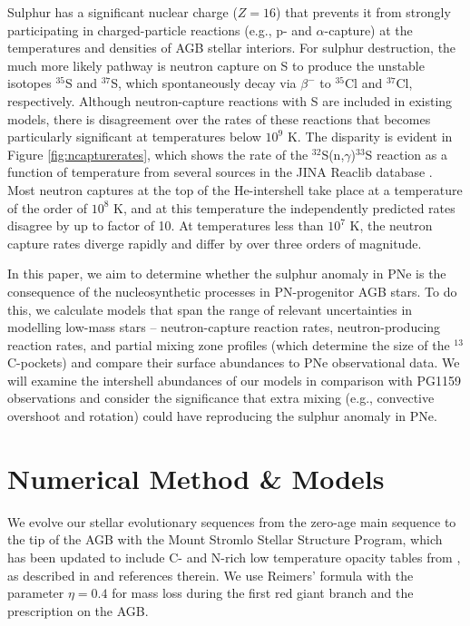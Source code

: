 Sulphur has a significant nuclear charge ($Z=16$) that prevents it from strongly participating in charged-particle reactions (e.g., p- and $\alpha$-capture) at the temperatures and densities of AGB stellar interiors. For sulphur destruction, the much more likely pathway is neutron capture on S to produce the unstable isotopes $^{35}$S and $^{37}$S, which spontaneously decay via $\beta^-$ to $^{35}$Cl and $^{37}$Cl, respectively.  Although neutron-capture reactions with S are included in existing models, there is disagreement over the rates of these reactions that becomes particularly significant at temperatures below $10^9$ K. The disparity is evident in Figure \ref{fig:ncapturerates}, which shows the rate of the $^{32}$S(n,$\gamma$)$^{33}$S reaction as a function of temperature from several sources in the JINA Reaclib database \citep{Cyburt:2010ey}. Most neutron captures at the top of the He-intershell take place at a temperature of the order of $10^8$ K, and at this temperature the independently predicted rates disagree by up to factor of 10. At temperatures less than $10^7$ K, the neutron capture rates diverge rapidly and differ by over three orders of magnitude.

In this paper, we aim to determine whether the sulphur anomaly in PNe is the consequence of the nucleosynthetic processes in PN-progenitor AGB stars. To do this, we calculate models that span the range of relevant uncertainties in modelling low-mass stars -- neutron-capture reaction rates, neutron-producing reaction rates, and partial mixing zone profiles (which determine the size of the $^{13}$C-pockets) and compare their surface abundances to PNe observational data. We will examine the intershell abundances of our models in comparison with PG1159 observations and consider the significance that extra mixing (e.g., convective overshoot and rotation) could have reproducing the sulphur anomaly in PNe.

\section{Numerical Method \& Models}
We evolve our stellar evolutionary sequences from the zero-age main sequence to the tip of the AGB with the Mount Stromlo Stellar Structure Program, which has been updated to include C- and N-rich low temperature opacity tables from \citet{Lederer:2009da}, as described in \citet{Karakas:2010dk} and references therein. We use Reimers' formula \citep{Reimers:1975vw} with the parameter $\eta=0.4$ for mass loss during the first red giant branch and the \citet{Vassiliadis:1993jk} prescription on the AGB.

